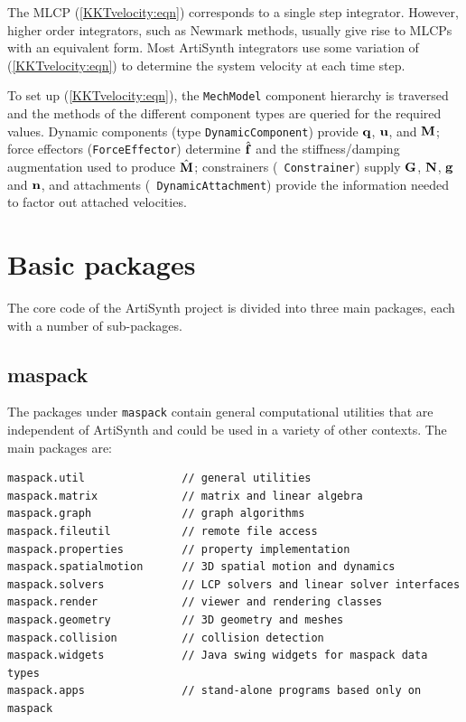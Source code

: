 The MLCP (\ref{KKTvelocity:eqn}) corresponds to a single step
integrator. However, higher order integrators, such as Newmark
methods, usually give rise to MLCPs with an equivalent form.  Most
ArtiSynth integrators use some variation of (\ref{KKTvelocity:eqn}) to
determine the system velocity at each time step.

To set up (\ref{KKTvelocity:eqn}), the {\tt MechModel} component
hierarchy is traversed and the methods of the different component
types are queried for the required values.  Dynamic components (type
{\tt DynamicComponent}) provide ${\bf q}$, ${\bf u}$, and ${\bf M}$; force effectors
({\tt ForceEffector}) determine $\hat{{\bf f}}$ and the stiffness/damping
augmentation used to produce $\hat{{\bf M}}$; constrainers ({\tt
Constrainer}) supply ${\bf G}$, ${\bf N}$, ${\bf g}$ and ${\bf n}$, and attachments ({\tt
DynamicAttachment}) provide the information needed to factor out
attached velocities.

\section{Basic packages}

The core code of the ArtiSynth project is divided into three main
packages, each with a number of sub-packages.

\subsection{maspack}

The packages under {\tt maspack} contain general computational
utilities that are independent of ArtiSynth and could be
used in a variety of other contexts. The main packages are:

\begin{lstlisting}[]
maspack.util               // general utilities
maspack.matrix             // matrix and linear algebra
maspack.graph              // graph algorithms
maspack.fileutil           // remote file access 
maspack.properties         // property implementation
maspack.spatialmotion      // 3D spatial motion and dynamics
maspack.solvers            // LCP solvers and linear solver interfaces
maspack.render             // viewer and rendering classes
maspack.geometry           // 3D geometry and meshes
maspack.collision          // collision detection
maspack.widgets            // Java swing widgets for maspack data types 
maspack.apps               // stand-alone programs based only on maspack
\end{lstlisting}


